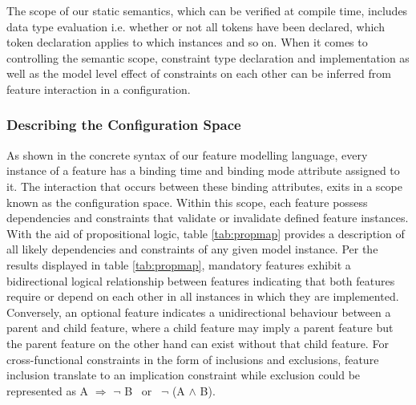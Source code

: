 \documentclass[conference]{IEEEtran}
\begin{document}
The scope of our static semantics, which can be verified  at compile time, includes data type evaluation i.e. whether or not all tokens have been declared, which token declaration applies to which instances and so on. When it comes to controlling the semantic scope, constraint type declaration and implementation as well as the model level effect of constraints on each other can be inferred from feature interaction in a configuration.

\subsubsection{Describing the Configuration Space}
As shown in the concrete syntax of our feature modelling language, every instance of a feature has a binding time and binding mode attribute assigned to it. The interaction that occurs between these binding attributes, exits in a scope known as the configuration space. Within this scope, each feature possess dependencies and constraints that validate or invalidate defined feature instances. With the aid of propositional logic, table \ref{tab:propmap} provides a description of all likely dependencies and constraints of any given model instance. Per the results displayed in table \ref{tab:propmap}, mandatory features exhibit a bidirectional logical relationship between features indicating that both features require or depend on each other in all instances in which they are implemented. Conversely, an optional feature indicates a unidirectional behaviour between a parent and child feature, where a child feature may imply a parent feature but the parent feature on the other hand can exist without that child feature. For cross-functional constraints in the form of inclusions and exclusions, feature inclusion translate to an implication constraint while exclusion could be represented as  A $\Rightarrow$ $\neg$ B \ or \ $\neg$ (A $\land$ B).
\end{document}
